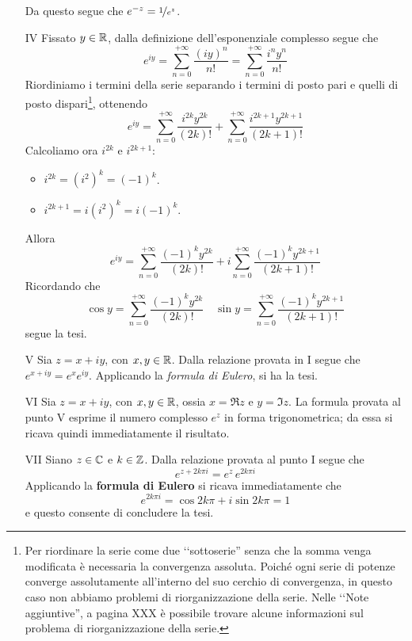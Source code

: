 \begin{demonstration}
\begin{enumerate}[label=\Roman*]
\begin{equation*}
\end{equation*}
Da questo segue che $e^{-z} = \nicefrac{1}{e^z}$.
\item[IV] Fissato $y\in\mathbb{R}$, dalla definizione dell'esponenziale complesso segue che
\begin{equation*}
	e^{iy}=\sum_{n=0}^{+\infty}\frac{\left(iy\right)^n}{n!}=\sum_{n=0}^{+\infty}\frac{i^ny^n}{n!}
\end{equation*}
Riordiniamo i termini della serie separando i termini di posto pari e quelli di posto dispari\footnote{Per riordinare la serie come due ‘‘sottoserie'' senza che la somma venga modificata è necessaria la convergenza assoluta. Poiché ogni serie di potenze converge assolutamente all'interno del suo cerchio di convergenza, in questo caso non abbiamo problemi di riorganizzazione della serie. Nelle ‘‘Note aggiuntive'', a pagina XXX è possibile trovare alcune informazioni sul problema di riorganizzazione della serie.}, ottenendo
\begin{equation*}
	e^{iy}=\sum_{n=0}^{+\infty}\frac{i^{2k}y^{2k}}{\left(2k\right)!}+\sum_{n=0}^{+\infty}\frac{i^{2k+1}y^{2k+1}}{\left(2k+1\right)!}
\end{equation*}
Calcoliamo ora $i^{2k}$ e $i^{2k+1}$:
\begin{itemize}
	\item $i^{2k}=\left(i^2\right)^k=\left(-1\right)^k$.
	\item $i^{2k+1}=i\left(i^2\right)^k=i\left(-1\right)^k$.
\end{itemize}
Allora
\begin{equation*}
	e^{iy}=\sum_{n=0}^{+\infty}\frac{\left(-1\right)^ky^{2k}}{\left(2k\right)!}+i\sum_{n=0}^{+\infty}\frac{\left(-1\right)^ky^{2k+1}}{\left(2k+1\right)!}
\end{equation*}
Ricordando che
\begin{equation*}
	\cos y=\sum_{n=0}^{+\infty}\frac{\left(-1\right)^ky^{2k}}{\left(2k\right)!}\quad
	\sin y=\sum_{n=0}^{+\infty}\frac{\left(-1\right)^ky^{2k+1}}{\left(2k+1\right)!}
\end{equation*}
segue la tesi.
\item[V] Sia $z=x+iy$, con $x,y\in\mathbb{R}$. Dalla relazione provata in I segue che $e^{x+iy}=e^xe^{iy}$. Applicando la \textit{formula di Eulero}, si ha la tesi.
\item[VI] Sia $z=x+iy$, con $x,y\in \mathbb{R}$, ossia $x=\Re z$ e $y=\Im z$. 
La formula provata al punto V esprime il numero complesso $e^z$ in forma trigonometrica; da essa si ricava quindi immediatamente il risultato.
\item[VII]  Siano $z\in \mathbb{C}$ e $k\in \mathbb{Z}$. Dalla relazione provata al punto I segue che 
\begin{equation*}
	e^{z+2k\pi i}=e^{z}\, e^{2k\pi i}
\end{equation*}
Applicando la \textbf{formula di Eulero} si ricava immediatamente che 
\begin{equation*}
	e^{2k\pi i}=\cos 2k\pi +i\sin 2k\pi =1
\end{equation*}
e questo consente di concludere la tesi.\qedhere
\end{enumerate}
\end{demonstration}
